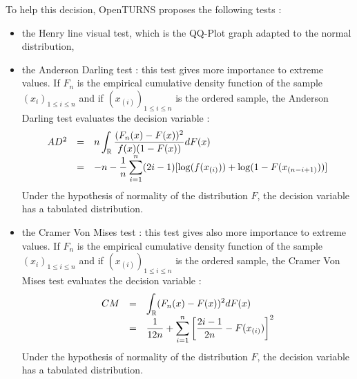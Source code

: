 To help this decision,  OpenTURNS proposes the following tests :
\begin{itemize}
\item the Henry line visual test, which is the QQ-Plot graph adapted to the normal distribution,
\item the Anderson Darling test : this test gives more importance to extreme values. If $F_n$ is the empirical cumulative density function of the sample $(x_i)_{1 \leq i \leq n}$ and if $(x_{(i)})_{1 \leq i \leq n}$ is the ordered sample, the Anderson Darling test evaluates the decision variable :
  \begin{align*}
    \begin{array}{lcl}
      AD^2 & = & \displaystyle  n \int_{{\mathbb R}} \frac{(F_n(x) - F(x))^2}{f(x)(1-F(x))} dF(x)\\
      & = &  \displaystyle -n -\frac{1}{n} \sum_{i=1}^{n} (2i-1)[\log(f(x_{(i)})) + \log(1-F(x_{(n-i+1)}))]
    \end{array}
  \end{align*}
  Under the hypothesis of normality of the distribution $F$, the decision variable has a tabulated distribution.
\item the Cramer Von Mises test : this test gives also more importance to extreme values. If $F_n$ is the empirical cumulative density function of the sample $(x_i)_{1 \leq i \leq n}$ and if $(x_{(i)})_{1 \leq i \leq n}$ is the ordered sample, the Cramer Von Mises test evaluates the decision variable :
  \begin{align*}
    \begin{array}{lcl}
      CM & = & \displaystyle  \int_{{\mathbb R}}(F_n(x) - F(x))^2dF(x)\\
      & = &  \displaystyle \frac{1}{12n} + \sum_{i=1}^{n} \left[\frac{2i-1}{2n} - F(x_{(i)}) \right]^2
    \end{array}
  \end{align*}
  Under the hypothesis of normality of the distribution $F$, the decision variable has a tabulated distribution.
\end{itemize}

